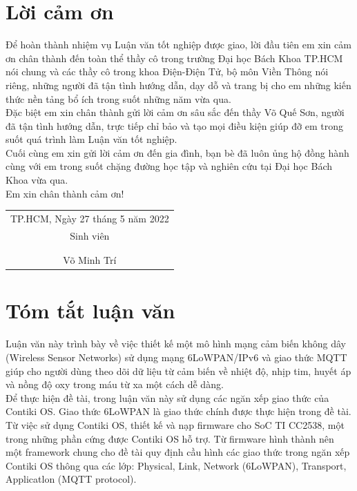 \documentclass{report}
\begin{document}
\chapter*{\huge Lời cảm ơn}
\large{Để hoàn thành nhiệm vụ Luận văn tốt nghiệp được giao, lời đầu tiên em xin cảm ơn chân thành đến toàn thể thầy cô trong trường Đại học Bách Khoa TP.HCM nói chung và các thầy cô trong khoa Điện-Điện Tử, bộ môn Viền Thông nói riêng, những người đã tận tình hướng dẫn, dạy dỗ và trang bị cho em những kiến thức nền tảng bổ ích trong suốt những năm vừa qua.} \\

\large{Đặc biệt em xin chân thành gửi lời cảm ơn sâu sắc đến thầy Võ Quế Sơn, người đã tận tình hướng dẫn, trực tiếp chỉ bảo và tạo mọi điều kiện giúp đỡ em trong suốt quá trình làm Luận văn tốt nghiệp.}  \\

\large{Cuối cùng em xin gửi lời cảm ơn đến gia đình, bạn bè đã luôn ủng hộ đồng hành cùng với em trong suốt chặng đường học tập và nghiên cứu tại Đại học Bách Khoa vừa qua.}\\

\large{Em xin chân thành cảm ơn!} \\

\begin{table}[h]
	\raggedleft
	\begin{tabular}{c}
		TP.HCM, Ngày 27 tháng 5 năm 2022 \\
		Sinh viên                        \\
		\\
		\\
		Võ Minh Trí                     
	\end{tabular}
\end{table}

\chapter*{\huge Tóm tắt luận văn}
\large{Luận văn này trình bày về việc thiết kế một mô hình mạng cảm biến không dây (Wireless Sensor Networks) sử dụng mạng 6LoWPAN/IPv6 và giao thức MQTT giúp cho người dùng theo dõi dữ liệu từ cảm biến về nhiệt độ, nhịp tim, huyết áp và nồng độ oxy trong máu từ xa một cách dễ dàng.} \\

\large{Để thực hiện đề tài, trong luận văn này sử dụng các ngăn xếp giao thức của Contiki OS. Giao thức 6LoWPAN là giao thức chính được thực hiện trong đề tài. Từ việc sử dụng Contiki OS, thiết kế và nạp firmware cho SoC TI CC2538, một trong những phần cứng được Contiki OS hỗ trợ. Từ firmware hình thành nên một framework chung cho đề tài quy định cầu hình các giao thức trong ngăn xếp Contiki OS thông qua các lớp: Physical, Link, Network (6LoWPAN), Transport, Applicatlon (MQTT protocol).} \\
\end{document}
